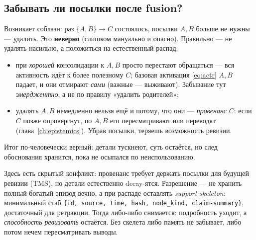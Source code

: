 \subsection{Забывать ли посылки после fusion?}

Возникает соблазн: раз $\{A, B\} \to C$ состоялось, посылки $A, B$ больше не
нужны --- удалить. Это \textbf{неверно} (слишком мануально и опасно).
Правильно --- не удалять насильно, а положиться на естественный распад:
\begin{itemize}
\item при \emph{хорошей} консолидации к $A, B$ просто перестают обращаться ---
вся активность идёт к более полезному $C$; базовая активация \eqref{eq:actr}
$A, B$ падает, и они отмирают \emph{сами} (важные --- выживают). Забывание
тут \emph{эмерджентно}, а не по правилу «удалить родителей»;
\item удалять $A, B$ немедленно нельзя ещё и потому, что они ---
\emph{провенанс} $C$: если $C$ позже опровергнут, по $A, B$ его
пересматривают или переводят (глава~\ref{ch:epistemics}). Убрав посылки,
теряешь возможность ревизии.
\end{itemize}
Итог по-человечески верный: детали тускнеют, суть остаётся, но след
обоснования хранится, пока не осыпался по неиспользованию.

\begin{principle}
Здесь есть скрытый конфликт: провенанс требует держать посылки для будущей
ревизии (TMS), но детали естественно decay-ятся. Разрешение --- не хранить
полный богатый эпизод вечно, а при распаде оставлять \emph{support skeleton}:
минимальный стаб \texttt{\{id, source, time, hash, node\_kind, claim-summary\}},
достаточный для ретракции. Тогда либо-либо снимается: подробность уходит, а
\emph{способность ревизовать} остаётся. Без скелета либо память не забывает,
либо потом нечем пересматривать выводы.
\end{principle}

